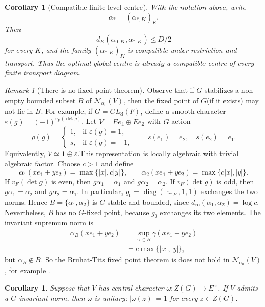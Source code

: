 \documentclass[12pt]{article}
\newtheorem{corollary}[theorem]{Corollary}
\theoremstyle{definition}
\theoremstyle{remark}
\newtheorem{remark}[theorem]{Remark}
\newcommand{\Norm}{\mathscr N}
\begin{document}
\begin{corollary}[Compatible finite-level centre]
\label{cor:compatible-finite-level-center}
With the notation above, write
\[
 \alpha_*=(\alpha_{*,K})_K.
\]
Then
\[
 d_K(\alpha_{0,K},\alpha_{*,K})\leq D/2
\]
for every \(K\), and the family \((\alpha_{*,K})_K\) is compatible under
restriction and transport.  Thus the optimal global centre is already a
compatible centre of every finite transport diagram.
\end{corollary}

\begin{remark}[There is no fixed point theorem]
Observe that if $G$ stabilizes a non-empty bounded subset $B$ of $\Norm_{\alpha_0}(V)$, then the fixed point of $G$(if it exists) may not lie in $B$. For example, if $G=GL_3(F)$, define a smooth character $\varepsilon(g)=(-1)^{v_F(\det g)}$.
Let $V=Ee_1\oplus Ee_2$ with \(G\)-action
\[
\rho(g)=
\begin{cases}
	1, & \text{if } \varepsilon(g)=1,\\
	s, & \text{if } \varepsilon(g)=-1,
\end{cases}
\qquad
s(e_1)=e_2,\quad s(e_2)=e_1.
\]
Equivalently, $V\simeq \mathbf{1}\oplus\varepsilon$.This representation is locally algebraic with trivial algebraic factor. Choose \(c>1\) and define
\[
\alpha_1(xe_1+ye_2)
=\max\bigl\{|x|,c|y|\bigr\},
\qquad
\alpha_2(xe_1+ye_2)
=\max\bigl\{c|x|,|y|\bigr\}.
\]
If \(v_F(\det g)\) is even, then $g\alpha_1=\alpha_1$ and $g\alpha_2=\alpha_2$. If \(v_F(\det g)\) is odd, then $g\alpha_1=\alpha_2$ and
$g\alpha_2=\alpha_1$. In particular, $g_0=\operatorname{diag}(\varpi_F,1,1)$ exchanges the two norms. Hence $B=\{\alpha_1,\alpha_2\}$ is \(G\)-stable and bounded, since $d_\infty(\alpha_1,\alpha_2)=\log c$. Nevertheless, \(B\) has no \(G\)-fixed point, because \(g_0\) exchanges
its two elements. The invariant supremum norm is
\[
\begin{aligned}
	\alpha_B(xe_1+ye_2)
	&=\sup_{\gamma\in B}\gamma(xe_1+ye_2)\\
	&=c\max\bigl\{|x|,|y|\bigr\},
\end{aligned}
\]
but $\alpha_B\notin B$. So the Bruhat-Tits fixed point theorem is does not hold in $\Norm_{\alpha_0}(V)$, for example \cite[Theorem 11.23]{MR2439729}.

\end{remark}

\begin{corollary}\label{cor:center}
Suppose that $V$ has central character $\omega:Z(G)\to E^\times$.  If
$V$ admits a $G$-invariant norm, then $\omega$ is unitary:
$|\omega(z)|=1$ for every $z\in Z(G)$.
\end{corollary}
\end{document}
